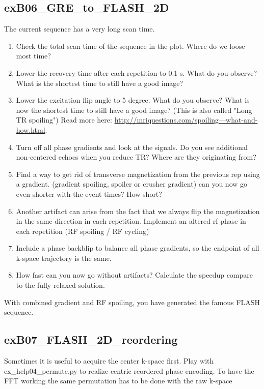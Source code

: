 \documentclass[a4paper,12pt]{extarticle}
\begin{document}
\subsection{exB06\_GRE\_to\_FLASH\_2D}
The current sequence has a very long scan time.
\begin{enumerate}
\item Check the total scan time of the sequence in the plot. Where do we loose most time?
\item Lower the recovery time after each repetition to 0.1 s.  
    What do you observe?
    What is the shortest time to still have a good image?   
\item Lower the excitation flip angle to 5 degree.
    What do you observe?
    What is now the shortest time to still have a good image? (This is also called "Long TR spoiling") Read more here: \href{http://mriquestions.com/spoiling---what-and-how.html}{http://mriquestions.com/spoiling---what-and-how.html}.
\item Turn off all phase gradients and look at the signals. 
    Do you see additional non-centered echoes when you reduce TR? Where are they originating from? 
\item Find a way to get rid of transverse magnetization from the previous rep using a gradient. (gradient spoiling, spoiler or crusher gradient)
    can you now go even shorter with the event times? How short?    

\item Another artifact can arise from the fact that we always flip the magnetization in the same direction in each repetition. Implement an altered rf phase in each repetition (RF spoiling / RF cycling)

\item  Include a phase backblip to balance all phase gradients, so the endpoint of all k-space trajectory is the same. 

\item How fast can you now go without artifacts? Calculate the speedup compare to the fully relaxed solution.
\end{enumerate}

With combined gradient and RF spoiling, you have generated the famous FLASH sequence.

\subsection{exB07\_FLASH\_2D\_reordering}
Sometimes it is useful to acquire the center k-space first.
Play with ex\_help04\_permute.py to realize centric reordered phase encoding.
To have the FFT working the same permutation has to be done with the raw k-space
\end{document}
